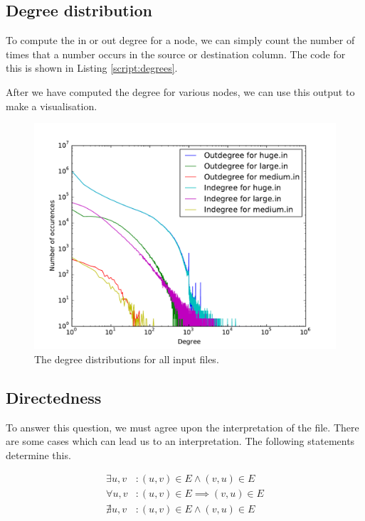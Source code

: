 \documentclass[12pt,a4paper,hidelinks]{article}
\begin{document}
\subsection{Degree distribution}

To compute the in or out degree for a node, we can simply count the number of times that a number occurs in the source or destination column. The code for this is shown in Listing \ref{script:degrees}.



After we have computed the degree for various nodes, we can use this output to make a visualisation.



\begin{figure}
	\centering
	\includegraphics[scale=0.83]{degree-distributions}
	\caption{The degree distributions for all input files.}
	\label{fig:degrees}
\end{figure}

\subsection{Directedness}

To answer this question, we must agree upon the interpretation of the file. There are some cases which can lead us to an interpretation. The following statements determine this.

\begin{align}
\label{eq:somereflex} \exists u, v &: (u, v) \in E \land (v, u) \in E \\
\label{eq:allreflex} \forall u, v &: (u, v) \in E \implies (v, u) \in E \\
\label{eq:noreflex}\nexists u, v &: (u, v) \in E \land (v, u) \in E
\end{align}
\end{document}
